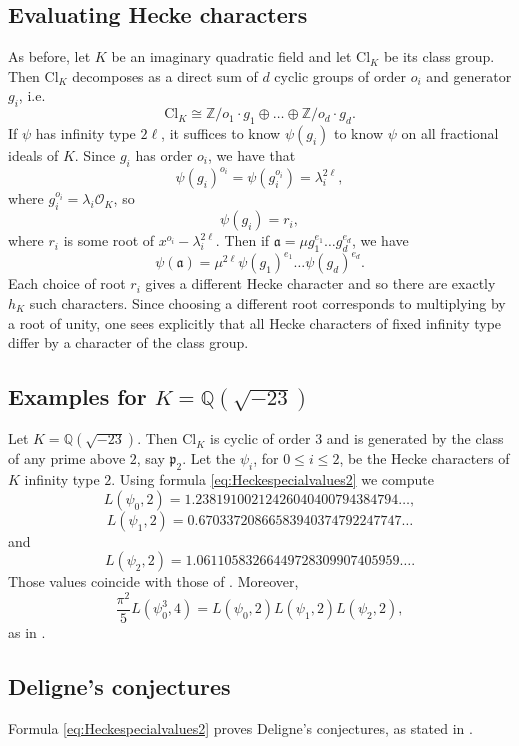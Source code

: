 \documentclass[twoside,10pt]{article}
\newcommand{\Z}{\mathbb{Z}}
\newcommand{\Q}{\mathbb{Q}}
\newcommand{\p}{\mathfrak{p}}
\newcommand{\ida}{\mathfrak{a}}
\newcommand{\Clk}{\text{Cl}_K}
\renewcommand{\O}{\mathcal{O}}
\begin{document}
\subsection{Evaluating Hecke characters}
As before, let $K$ be an imaginary quadratic field and let $\Clk$ be its class group. Then $\Clk$ decomposes as a direct sum of $d$ cyclic groups of order $o_i$ and generator $g_i$, i.e.
\[\Clk\cong \Z/o_1\cdot g_1\oplus\dots\oplus\Z/o_d\cdot g_d.\]
If $\psi$ has infinity type $2\ell$, it suffices to know $\psi(g_i)$ to know $\psi$ on all fractional ideals of $K$. Since $g_i$ has order $o_i$, we have that
\[\psi(g_i)^{o_i}=\psi(g_i^{o_i})=\lambda_i^{2\ell},\]
where $g_i^{o_i}=\lambda_i\O_K$, so
\[\psi(g_i)=r_i,\]
where $r_i$ is some root of $x^{o_i}-\lambda_i^{2\ell}$. Then if $\ida = \mu g_1^{e_1}\dots g_d^{e_d}$, we have
\[\psi(\ida)=\mu^{2\ell}\psi(g_1)^{e_1}\dots\psi(g_d)^{e_d}.\]
Each choice of root $r_i$ gives a different Hecke character and so there are exactly $h_K$ such characters. Since choosing a different root corresponds to multiplying by a root of unity, one sees explicitly that all Hecke characters of fixed infinity type differ by a character of the class group.

\subsection{Examples for $K=\Q(\sqrt{-23})$}
Let $K=\Q(\sqrt{-23})$. Then $\Clk$ is cyclic of order $3$ and is generated by the class of any prime above $2$, say $\p_2$. Let the $\psi_i$, for $0\leq i\leq 2$, be the Hecke characters of $K$ infinity type $2$. Using formula \ref{eq:Heckespecialvalues2} we compute
\[L(\psi_0,2) = 1.23819100212426040400794384794\dots,\]
\[L(\psi_1,2) = 0.67033720866583940374792247747\dots \]
and
\[L(\psi_2,2) = 1.06110583266449728309907405959\dots.\]
Those values coincide with those of \cite[Sec 6.1]{Wat}. Moreover,
\[\frac{\pi^2}{5}L(\psi_0^3,4)=L(\psi_0,2)L(\psi_1,2)L(\psi_2,2),\]
as in \cite[Sec 6.1]{Wat}.

\subsection{Deligne's conjectures}
Formula \ref{eq:Heckespecialvalues2} proves Deligne's conjectures, as stated in \cite[Sec 5.3.2]{Wat}.
\end{document}
